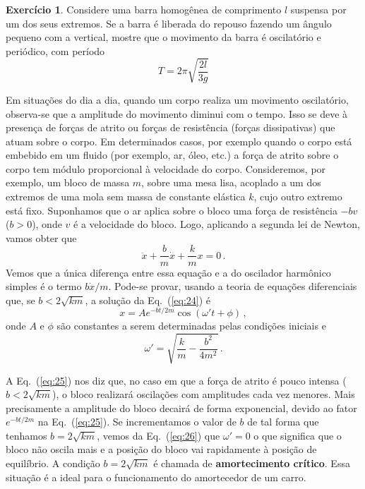 \documentclass[twocolumn=on,fontsize=12pt,DIV=calc]{scrartcl}
\theoremstyle{definition}
\newtheorem{ex}{Exercício}[section]
\begin{document}
\begin{ex}
  Considere uma barra homogênea de comprimento $l$ suspensa por um dos
  seus extremos. Se a barra é liberada do repouso fazendo um ângulo
  pequeno com a vertical, mostre que o movimento da barra é
  oscilatório e periódico, com período
  $$T=2\pi\sqrt{\frac{2l}{3g}}$$
\end{ex}

Em situações do dia a dia, quando um corpo realiza um movimento
oscilatório, observa-se que a amplitude do movimento diminui com o
tempo. Isso se deve à presença de forças de atrito ou forças de
resistência (forças dissipativas) que atuam sobre o corpo. Em
determinados casos, por exemplo quando o corpo está embebido em um
fluido (por exemplo, ar, óleo, etc.) a força de atrito sobre o corpo
tem módulo proporcional à velocidade do corpo. Consideremos, por
exemplo, um bloco de massa $m$, sobre uma mesa lisa, acoplado a um dos
extremos de uma mola sem massa de constante elástica $k$, cujo outro
extremo está fixo. Suponhamos que o ar aplica sobre o bloco uma força
de resistência $-bv$ ($b>0$), onde $v$ é a velocidade do bloco. Logo,
aplicando a segunda lei de Newton, vamos obter que
\begin{equation}
  \label{eq:24}
  \ddot x+\frac{b}{m}\dot x+\frac{k}{m}x=0\,.
\end{equation}
Vemos que a única diferença entre essa equação e a do oscilador
harmônico simples é o termo $b\dot x/m$. Pode-se provar, usando a
teoria de equações diferenciais que, se $b<2\sqrt{km}$, a solução da
Eq.~(\ref{eq:24}) é
\begin{equation}
  \label{eq:25}
  x=Ae^{-bt/2m}\cos(\omega' t+\phi)\,,
\end{equation}
onde $A$ e $\phi$ são constantes a serem determinadas pelas condições
iniciais e
\begin{equation}
  \label{eq:26}
  \omega'=\sqrt{\frac{k}{m}-\frac{b^2}{4m^2}}\,.
\end{equation}

A Eq.~(\ref{eq:25}) nos diz que, no caso em que a força de atrito é
pouco intensa ($b<2\sqrt{km}$), o bloco realizará oscilações com
amplitudes cada vez menores. Mais precisamente a amplitude do bloco
decairá de forma exponencial, devido ao fator $e^{-bt/2m}$ na
Eq.~(\ref{eq:25}).  Se incrementamos o valor de $b$ de tal forma que
tenhamos $b=2\sqrt{km}$, vemos da Eq.~(\ref{eq:26}) que $\omega'=0$ o
que significa que o bloco não oscila mais e a posição do bloco vai
rapidamente à posição de equilíbrio. A condição $b=2\sqrt{km}$ é
chamada de \textbf{amortecimento crítico}. Essa situação é a ideal
para o funcionamento do amortecedor de um carro.
\end{document}
